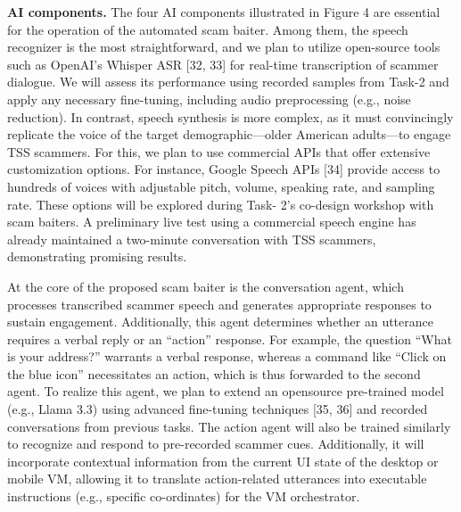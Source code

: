 \textbf{AI components.} The four AI components illustrated in Figure 4 are essential for the operation
of the automated scam baiter. Among them, the speech recognizer is the most straightforward, and we
plan to utilize open-source tools such as OpenAI’s Whisper ASR [32, 33] for real-time transcription of
scammer dialogue. We will assess its performance using recorded samples from Task-2 and apply any
necessary fine-tuning, including audio preprocessing (e.g., noise reduction). In contrast, speech synthesis
is more complex, as it must convincingly replicate the voice of the target demographic—older American
adults—to engage TSS scammers. For this, we plan to use commercial APIs that offer extensive
customization options. For instance, Google Speech APIs [34] provide access to hundreds of voices with
adjustable pitch, volume, speaking rate, and sampling rate. These options will be explored during Task-
2’s co-design workshop with scam baiters. A preliminary live test using a commercial speech engine has
already maintained a two-minute conversation with TSS scammers, demonstrating promising results.

At the core of the proposed scam baiter is the conversation agent, which processes transcribed scammer
speech and generates appropriate responses to sustain engagement. Additionally, this agent determines
whether an utterance requires a verbal reply or an “action” response. For example, the question “What is
your address?” warrants a verbal response, whereas a command like “Click on the blue icon” necessitates
an action, which is thus forwarded to the second agent. To realize this agent, we plan to extend an opensource
pre-trained model (e.g., Llama 3.3) using advanced fine-tuning techniques [35, 36] and recorded
conversations from previous tasks. The action agent will also be trained similarly to recognize and
respond to pre-recorded scammer cues. Additionally, it will incorporate contextual information from the
current UI state of the desktop or mobile VM, allowing it to translate action-related utterances into
executable instructions (e.g., specific co-ordinates) for the VM orchestrator.


